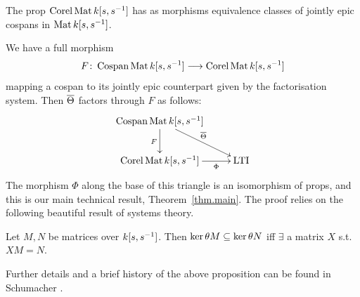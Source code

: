 \begin{definition}
  The prop $\operatorname{{Corel}} \operatorname{\mathrm{Mat}} {k[s,s^{-1}]}$ has as morphisms equivalence classes of
  jointly epic cospans in $\operatorname{\mathrm{Mat}}{k[s,s^{-1}]}$.  
\end{definition}

We have a full morphism
\[
  F{\colon} \operatorname{{Cospan}} \operatorname{\mathrm{Mat}} {k[s,s^{-1}]} \longrightarrow \operatorname{{Corel}} \operatorname{\mathrm{Mat}} {k[s,s^{-1}]}
\]
mapping a cospan to its jointly epic counterpart given by the
 factorisation system. %
Then $\overline{\Theta}$
factors through $F$ as follows:
\[
  \xymatrixrowsep{2pc}
  \xymatrix{
    \cospan\mat\pk \ar[d]_F \ar[dr]^{\cospanfunrest} \\
    \corel\mat\pk \ar[r]_-{\Phi} & \ltids
  }
\]
The morphism $\Phi$ along the base of this triangle is an isomorphism of props, 
and this is our main technical result, Theorem~\ref{thm.main}. The proof relies
on the following beautiful result of systems theory.

\begin{proposition} \label{prop.magic}
  Let $M,N$ be matrices over ${k[s,s^{-1}]}$. Then $\ker \theta M \subseteq \ker \theta N$ iff $\exists$ a matrix $X$ s.t.\ $XM = N$.
\end{proposition}

Further details and a brief history of the above proposition can be found in
Schumacher \cite[pp.7--9]{Sc}. 

